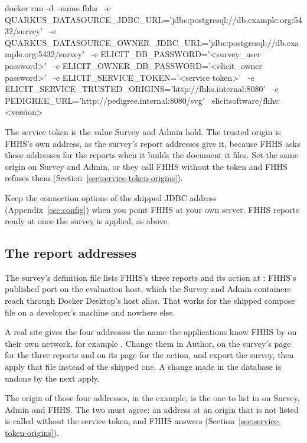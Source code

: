 \documentclass[11pt, a4paper]{article}
\begin{document}
\begin{elicitcmd}[fontsize = \scriptsize]
docker run -d --name fhhs \
  -e QUARKUS_DATASOURCE_JDBC_URL='jdbc:postgresql://db.example.org:5432/survey' \
  -e QUARKUS_DATASOURCE_OWNER_JDBC_URL='jdbc:postgresql://db.example.org:5432/survey' \
  -e ELICIT_DB_PASSWORD='<survey_user password>' \
  -e ELICIT_OWNER_DB_PASSWORD='<elicit_owner password>' \
  -e ELICIT_SERVICE_TOKEN='<service token>' \
  -e ELICIT_SERVICE_TRUSTED_ORIGINS='http://fhhs.internal:8080' \
  -e PEDIGREE_URL='http://pedigree.internal:8080/svg' \
  elicitsoftware/fhhs:<version>
\end{elicitcmd}

The service token is the value Survey and Admin hold. The trusted origin is FHHS's own
address, as the survey's report addresses give it, because FHHS asks those addresses for the
reports when it builds the document it files. Set the same origin on Survey and Admin, or they
call FHHS without the token and FHHS refuses them
(Section~\ref{sec:service-token-origins}).

Keep the connection options of the shipped JDBC address (Appendix~\ref{sec:config}) when you
point FHHS at your own server. FHHS reports ready at  once the survey is
applied, as above.

\subsection{The report addresses}

The survey's definition file lists FHHS's three reports and its action at
: FHHS's published port on the evaluation host, which
the Survey and Admin containers reach through Docker Desktop's host alias. That works for the
shipped compose file on a developer's machine and nowhere else.

A real site gives the four addresses the name the applications know FHHS by on their own
network, for example . Change them in Author, on the
survey's  page for the three reports and on its 
page for the action, and export the survey, then apply that file instead of the shipped one.
A change made in the database is undone by the next apply.

The origin of those four addresses,  in the example, is the one
to list in  on Survey, Admin and FHHS. The two must agree:
an address at an origin that is not listed is called without the service token, and FHHS
answers \val{401} (Section~\ref{sec:service-token-origins}).
\end{document}
